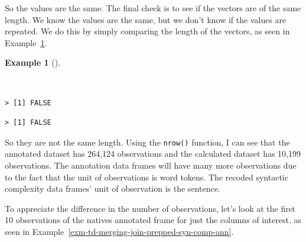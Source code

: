 \documentclass[
  letterpaper,
]{latex/krantz}
\newenvironment{Shaded}{\begin{snugshade}}{\end{snugshade}}
\newcommand{\CommentTok}[1]{\textcolor[rgb]{0.00,0.00,0.00}{\textit{#1}}}
\newcommand{\FunctionTok}[1]{\textcolor[rgb]{0.00,0.00,0.00}{#1}}
\newcommand{\NormalTok}[1]{\textcolor[rgb]{0.00,0.00,0.00}{#1}}
\newcommand{\SpecialCharTok}[1]{\textcolor[rgb]{0.00,0.00,0.00}{#1}}
\theoremstyle{definition}
\newtheorem{example}{Example}[chapter]
\theoremstyle{remark}
\begin{document}
So the values are the same. The final check is to see if the vectors are
of the same length. We know the values are the same, but we don't know
if the values are repeated. We do this by simply comparing the length of
the vectors, as seen in
Example~\ref{exm-td-merging-join-prepped-syn-comp-length}.

\begin{example}[]\protect\hypertarget{exm-td-merging-join-prepped-syn-comp-length}{}\label{exm-td-merging-join-prepped-syn-comp-length}

~

\begin{Shaded}
\end{Shaded}

\begin{verbatim}
> [1] FALSE
\end{verbatim}

\begin{Shaded}
\end{Shaded}

\begin{verbatim}
> [1] FALSE
\end{verbatim}

\end{example}

So they are not the same length. Using the \texttt{nrow()} function, I
can see that the annotated dataset has 264,124 observations and the
calculated dataset has 10,199 observations. The annotation data frames
will have many more observations due to the fact that the unit of
observations is word tokens. The recoded syntactic complexity data
frames' unit of observation is the sentence.

To appreciate the difference in the number of observations, let's look
at the first 10 observations of the natives annotated frame for just the
columns of interest, as seen in
Example~\ref{exm-td-merging-join-prepped-syn-comp-ann}.
\end{document}
